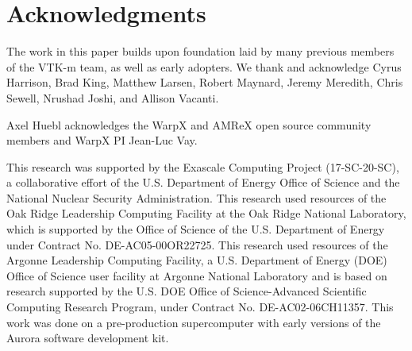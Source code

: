 \section{Acknowledgments}


The work in this paper builds upon foundation laid by many previous members of the VTK-m team, as well as early adopters.  We thank and acknowledge
Cyrus Harrison, 
Brad King, 
Matthew Larsen,
Robert Maynard, 
Jeremy Meredith, 
Chris Sewell,
Nrushad Joshi,
and
Allison Vacanti.

Axel Huebl acknowledges the WarpX and AMReX open source community members and WarpX PI Jean-Luc Vay.

This research was supported by the Exascale Computing Project (17-SC-20-SC), a collaborative effort of the U.S. Department of Energy Office of Science and the National Nuclear Security Administration.
This research used resources of the Oak Ridge Leadership Computing Facility at the Oak Ridge National Laboratory, which is supported by the Office of Science of the U.S. Department of Energy under Contract No. DE-AC05-00OR22725.
This research used resources of the Argonne Leadership Computing Facility, a U.S. Department of Energy (DOE) Office of Science user facility at Argonne National Laboratory and is based on research supported by the U.S. DOE Office of Science-Advanced Scientific Computing Research Program, under Contract No. DE-AC02-06CH11357. This work was done on a pre-production supercomputer with early versions of the Aurora software development kit.
